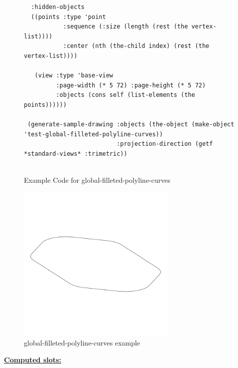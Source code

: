\documentclass [11pt]{book}
\begin{document}
\begin{itemize}
\begin{figure}
\begin{lrbox}{\boxedverb}
\begin{minipage}{\linewidth}
{\begin{verbatim}
  :hidden-objects
  ((points :type 'point
           :sequence (:size (length (rest (the vertex-list))))
           :center (nth (the-child index) (rest (the vertex-list))))

   (view :type 'base-view
         :page-width (* 5 72) :page-height (* 5 72)
         :objects (cons self (list-elements (the points))))))

 (generate-sample-drawing :objects (the-object (make-object 'test-global-filleted-polyline-curves))
                          :projection-direction (getf *standard-views* :trimetric))


\end{verbatim}}
\end{minipage}
\end{lrbox}
\fbox{\usebox{\boxedverb}}

\caption{Example Code for global-filleted-polyline-curves}

\label{fig:example-code-global-filleted-polyline-curves}

\end{figure}

\begin{figure}
\begin{center}
\includegraphics[width=3in,height=3in]{../images/example-global-filleted-polyline-curves.pdf}
\end{center}

\caption{global-filleted-polyline-curves example}

\label{fig:global-filleted-polyline-curves}

\end{figure}





\textbf{
\underline{Computed slots:}}


\end{itemize}
\end{document}
